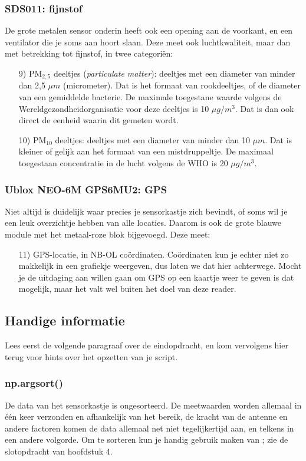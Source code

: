 \documentclass[a4paper,11pt, fleqn]{article}
\begin{document}
\subsubsection{SDS011: fijnstof}
De grote metalen sensor onderin heeft ook een opening aan de voorkant, en een ventilator die je soms aan hoort slaan. Deze meet ook luchtkwaliteit, maar dan met betrekking tot fijnstof, in twee categori\"en:
\begin{itemize}
	\item[9)] PM$_{2,5}$ deeltjes ({\it particulate matter}): deeltjes met een diameter van minder dan 2,5 $\mu m$ (micrometer). Dat is het formaat van rookdeeltjes, of de diameter van een gemiddelde bacterie. De maximale toegestane waarde volgens de Wereldgezondheidorganisatie voor deze deeltjes is 10 $\mu g/m^3$. Dat is dan ook direct de eenheid waarin dit gemeten wordt.
	\item[10)] PM$_{10}$ deeltjes: deeltjes met een diameter van minder dan 10 $\mu m$. Dat is kleiner of gelijk aan het formaat van een mistdruppeltje. De maximaal toegestaan concentratie in de lucht volgens de WHO is 20 $\mu g/m^3$. 
\end{itemize}

\subsubsection{Ublox NEO-6M GPS6MU2: GPS}
Niet altijd is duidelijk waar precies je sensorkastje zich bevindt, of soms wil je een leuk overzichtje hebben van alle locaties. Daarom is ook de grote blauwe module met het metaal-roze blok bijgevoegd. Deze meet:
\begin{itemize}
	\item[11)] GPS-locatie, in NB-OL co\"ordinaten. Co\"ordinaten kun je echter niet zo makkelijk in een grafiekje weergeven, dus laten we dat hier achterwege. Mocht je de uitdaging aan willen gaan om GPS op een kaartje weer te geven is dat mogelijk, maar het valt wel buiten het doel van deze reader.
\end{itemize}

\subsection{Handige informatie}
Lees eerst de volgende paragraaf over de eindopdracht, en kom vervolgens hier terug voor hints over het opzetten van je script.

\subsubsection*{np.argsort()}
De data van het sensorkastje is ongesorteerd. De meetwaarden worden allemaal in \'e\'en keer verzonden en afhankelijk van het bereik, de kracht van de antenne en andere factoren komen de data allemaal net niet tegelijkertijd aan, en telkens in een andere volgorde. Om te sorteren kun je handig gebruik maken van ; zie de slotopdracht van hoofdstuk 4.
\end{document}
